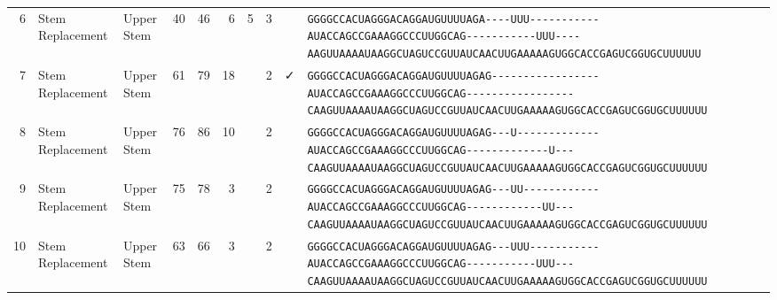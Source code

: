 \begin{tabular}{rllrrrrrcl}
 6 & Stem Replacement & Upper Stem & 40 & 46 & 6 & 5 & 3 &  &
 \color{ucsfdarkgrey}\verb|GGGGCCACUAGGGACAGGAU|\color{ucsforange}\verb|GUUUUA|\color{ucsfblue}\verb|GA----UUU-----------|\color{ucsfpurple}\verb|AUACCAGCCGAAAGGCCCUUGGCAG|\color{ucsfblue}\verb|-----------UUU----AAGU|\color{ucsforange}\verb|UAAAAUAA|\color{ucsfnavy}\verb|GGCUAGUCC|\color{ucsforange}\verb|GUUAUCA|\color{ucsfteal}\verb|ACUUGAAAAAGU|\color{ucsforange}\verb|GGCACCGAGUCGGUGCUUUUUU| \\

 7 & Stem Replacement & Upper Stem & 61 & 79 & 18 &  & 2 & ✓ &
 \color{ucsfdarkgrey}\verb|GGGGCCACUAGGGACAGGAU|\color{ucsforange}\verb|GUUUUA|\color{ucsfblue}\verb|GAG-----------------|\color{ucsfpurple}\verb|AUACCAGCCGAAAGGCCCUUGGCAG|\color{ucsfblue}\verb|-----------------CAAGU|\color{ucsforange}\verb|UAAAAUAA|\color{ucsfnavy}\verb|GGCUAGUCC|\color{ucsforange}\verb|GUUAUCA|\color{ucsfteal}\verb|ACUUGAAAAAGU|\color{ucsforange}\verb|GGCACCGAGUCGGUGCUUUUUU| \\

 8 & Stem Replacement & Upper Stem & 76 & 86 & 10 &  & 2 &  &
 \color{ucsfdarkgrey}\verb|GGGGCCACUAGGGACAGGAU|\color{ucsforange}\verb|GUUUUA|\color{ucsfblue}\verb|GAG---U-------------|\color{ucsfpurple}\verb|AUACCAGCCGAAAGGCCCUUGGCAG|\color{ucsfblue}\verb|-------------U---CAAGU|\color{ucsforange}\verb|UAAAAUAA|\color{ucsfnavy}\verb|GGCUAGUCC|\color{ucsforange}\verb|GUUAUCA|\color{ucsfteal}\verb|ACUUGAAAAAGU|\color{ucsforange}\verb|GGCACCGAGUCGGUGCUUUUUU| \\

 9 & Stem Replacement & Upper Stem & 75 & 78 & 3 &  & 2 &  &
 \color{ucsfdarkgrey}\verb|GGGGCCACUAGGGACAGGAU|\color{ucsforange}\verb|GUUUUA|\color{ucsfblue}\verb|GAG---UU------------|\color{ucsfpurple}\verb|AUACCAGCCGAAAGGCCCUUGGCAG|\color{ucsfblue}\verb|------------UU---CAAGU|\color{ucsforange}\verb|UAAAAUAA|\color{ucsfnavy}\verb|GGCUAGUCC|\color{ucsforange}\verb|GUUAUCA|\color{ucsfteal}\verb|ACUUGAAAAAGU|\color{ucsforange}\verb|GGCACCGAGUCGGUGCUUUUUU| \\

 10 & Stem Replacement & Upper Stem & 63 & 66 & 3 &  & 2 &  &
 \color{ucsfdarkgrey}\verb|GGGGCCACUAGGGACAGGAU|\color{ucsforange}\verb|GUUUUA|\color{ucsfblue}\verb|GAG---UUU-----------|\color{ucsfpurple}\verb|AUACCAGCCGAAAGGCCCUUGGCAG|\color{ucsfblue}\verb|-----------UUU---CAAGU|\color{ucsforange}\verb|UAAAAUAA|\color{ucsfnavy}\verb|GGCUAGUCC|\color{ucsforange}\verb|GUUAUCA|\color{ucsfteal}\verb|ACUUGAAAAAGU|\color{ucsforange}\verb|GGCACCGAGUCGGUGCUUUUUU| \\


\end{tabular}
